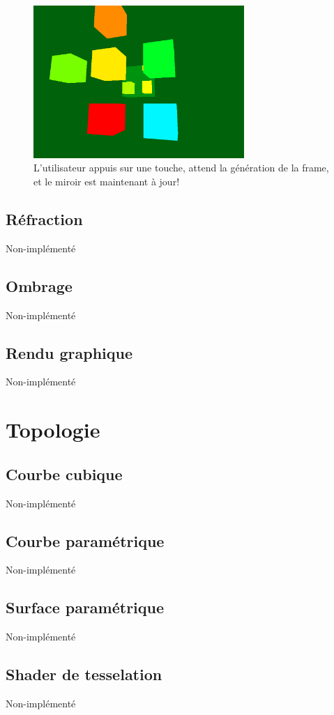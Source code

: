 \begin{figure}[h]
	\centering
	\includegraphics[width=8cm]{fig/CubeReflectionApresRefresh.png}
	\caption{L'utilisateur appuis sur une touche, attend la génération de la frame, et le miroir est maintenant à jour!}
	\label{fig:propriete}
\end{figure}

\subsection{Réfraction}
Non-implémenté

\subsection{Ombrage}
Non-implémenté

\subsection{Rendu graphique}
Non-implémenté


\pagebreak
\section{Topologie}
\subsection{Courbe cubique}
Non-implémenté

\subsection{Courbe paramétrique}
Non-implémenté

\subsection{Surface paramétrique}
Non-implémenté

\subsection{Shader de tesselation}
Non-implémenté

